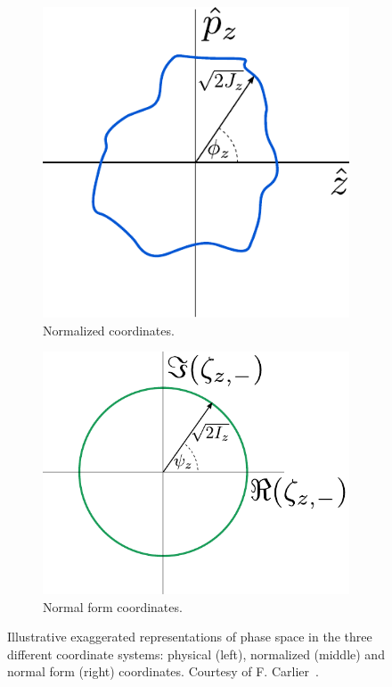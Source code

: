 \begin{figure}[!hbt]
\begin{subfigure}[b]{0.30\textwidth}
        \includegraphics[width=\textwidth]{Figures/Beam_Dynamics_Theory/phase_space_nonlinear_normalized.pdf}
        \caption{Normalized coordinates.}
        \label{fig:phase_space_normalized_non-linear}
    \end{subfigure}
    \hfill
    \begin{subfigure}[b]{0.3805\textwidth}
        \centering
        \includegraphics[width=\textwidth]{Figures/Beam_Dynamics_Theory/phase_space_nonlinear_normal_form.pdf}
        \caption{Normal form coordinates.}
        \label{fig:phase_space_normal_form_non-linear}
    \end{subfigure}
    \caption{Illustrative exaggerated representations of phase space in the three different coordinate systems: physical (left), normalized (middle) and normal form (right) coordinates. Courtesy of F. Carlier~\cite{PHD:Carlier}.}
    \label{figure:phase_space_non-linear_physical_normalized_normal_form_coordinates}
\end{figure}

